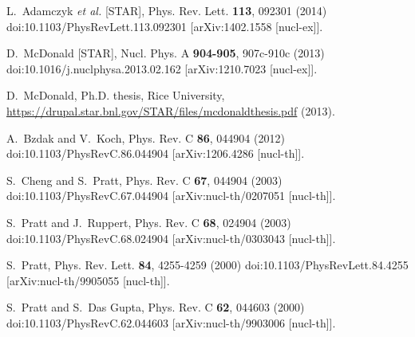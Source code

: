 \begin{thebibliography}{99}
L.~Adamczyk \textit{et al.} [STAR],
Phys. Rev. Lett. \textbf{113}, 092301 (2014)
doi:10.1103/PhysRevLett.113.092301
[arXiv:1402.1558 [nucl-ex]].

D.~McDonald [STAR],
Nucl. Phys. A \textbf{904-905}, 907c-910c (2013)
doi:10.1016/j.nuclphysa.2013.02.162
[arXiv:1210.7023 [nucl-ex]].

D.~McDonald,
Ph.D. thesis, Rice University, \href{https://drupal.star.bnl.gov/STAR/files/mcdonaldthesis.pdf}{https://drupal.star.bnl.gov/STAR/files/mcdonaldthesis.pdf} (2013).

A.~Bzdak and V.~Koch,
Phys. Rev. C \textbf{86}, 044904 (2012)
doi:10.1103/PhysRevC.86.044904
[arXiv:1206.4286 [nucl-th]].

S.~Cheng and S.~Pratt,
Phys. Rev. C \textbf{67}, 044904 (2003)
doi:10.1103/PhysRevC.67.044904
[arXiv:nucl-th/0207051 [nucl-th]].

S.~Pratt and J.~Ruppert,
Phys. Rev. C \textbf{68}, 024904 (2003)
doi:10.1103/PhysRevC.68.024904
[arXiv:nucl-th/0303043 [nucl-th]].

S.~Pratt,
Phys. Rev. Lett. \textbf{84}, 4255-4259 (2000)
doi:10.1103/PhysRevLett.84.4255
[arXiv:nucl-th/9905055 [nucl-th]].

S.~Pratt and S.~Das Gupta,
Phys. Rev. C \textbf{62}, 044603 (2000)
doi:10.1103/PhysRevC.62.044603
[arXiv:nucl-th/9903006 [nucl-th]].


\end{thebibliography}
